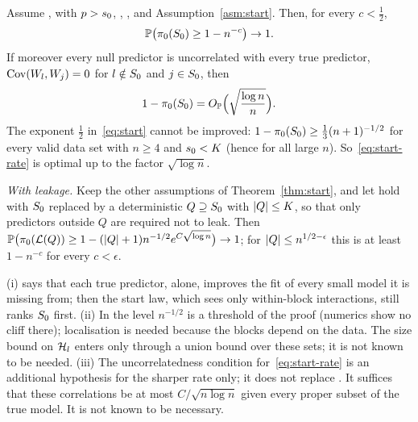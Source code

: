 \begin{theorem}\label{thm:start}
Assume ,  with $p>s_0$, , ,  and Assumption~\ref{asm:start}. Then, for every
$c<\tfrac12$,
\begin{equation}\label{eq:start}
  \mathbb{P}\big(\pi_0(S_0)\ge1-n^{-c}\big)\to1 .
\end{equation}
If moreover every null predictor is uncorrelated with every true predictor, $\operatorname{Cov}(W_l,W_j)=0$ for $l\notin S_0$ and
$j\in S_0$, then
\begin{equation}\label{eq:start-rate}
  1-\pi_0(S_0)=O_{\mathbb{P}}\Big(\sqrt{\frac{\log n}{n}}\Big).
\end{equation}
The exponent $\tfrac12$ in~\eqref{eq:start} cannot be improved: $1-\pi_0(S_0)\ge\tfrac13(n+1)^{-1/2}$ for every valid data
set with $n\ge4$ and $s_0<K$ (hence for all large $n$). So~\eqref{eq:start-rate} is optimal up to the factor
$\sqrt{\log n}$.
\end{theorem}


\begin{remark}\label{rem:start-cons}
\emph{With leakage.} Keep the other assumptions of Theorem~\ref{thm:start}, and let  hold with $S_0$ replaced by a
deterministic $Q\supseteq S_0$ with $\lvert Q\rvert\le K$, so that only predictors outside $Q$ are required not to leak. Then
$\mathbb{P}\big(\pi_0(\mathcal L(Q))\ge1-(\lvert Q\rvert+1)n^{-1/2}e^{C\sqrt{\log n}}\big)\to1$; for $\lvert Q\rvert\le n^{1/2-\epsilon}$ this is at
least $1-n^{-c}$ for every $c<\epsilon$.
\end{remark}

\begin{remark}\label{rem:start-asm}
(i)  says that each true predictor, alone, improves the fit of every small model it is missing from; then the start
law, which sees only within-block interactions, still ranks $S_0$ first.
(ii) In  the level $n^{-1/2}$ is a threshold of the proof (numerics show no cliff there); localisation is needed
because the blocks depend on the data. The size bound on $\mathcal H_l$ enters only through a union bound over these sets;
it is not known to be needed.
(iii) The uncorrelatedness condition for~\eqref{eq:start-rate} is an additional hypothesis for the sharper rate only; it
does not replace . It suffices that these correlations be at most $C/\sqrt{n\log n}$ given every proper subset of
the true model. It is not known to be necessary.
\end{remark}

